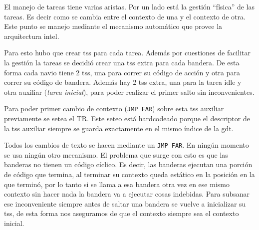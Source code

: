 	El manejo de tareas tiene varias aristas. Por un lado está
la gestión ``física'' de las tareas. Es decir como se cambia entre el contexto
de una y el contexto de otra. Este punto se manejo mediante el mecanismo
automático que provee la arquitectura intel.

	Para esto hubo que crear tss para cada tarea. Además por cuestiones
de facilitar la gestión la tareas se decidió crear una tss extra para cada
bandera. De esta forma cada navio tiene 2 tss, una para correr su código
de acción y otra para correr su código de bandera. Además hay 2 tss
extra, una para la tarea idle y otra auxiliar (\emph{tarea inicial}), para poder realizar
el primer salto sin inconvenientes.

	Para poder primer cambio de contexto (\texttt{JMP FAR}) sobre esta
tss auxiliar previamente se setea el TR. Este seteo está hardcodeado
porque el descriptor de la tss auxiliar siempre se guarda exactamente
en el mismo índice de la gdt.

	Todos los cambios de texto se hacen mediante un \texttt{JMP FAR}. En ningún
momento se usa ningún otro mecanismo. El problema que surge con
esto es que las banderas no tienen un código cíclico. Es decir, las banderas
ejecutan una porción de código que termina, al terminar su contexto queda
estático en la posición en la que terminó, por lo tanto si se llama a esa bandera
otra vez en ese mismo contexto sin hacer nada la bandera va a ejecutar 
cosas indebidas. Para subsanar ese inconveniente siempre antes de saltar una
bandera se vuelve a inicializar su tss, de esta forma nos aseguramos de que el contexto
siempre sea el contexto inicial.

	
